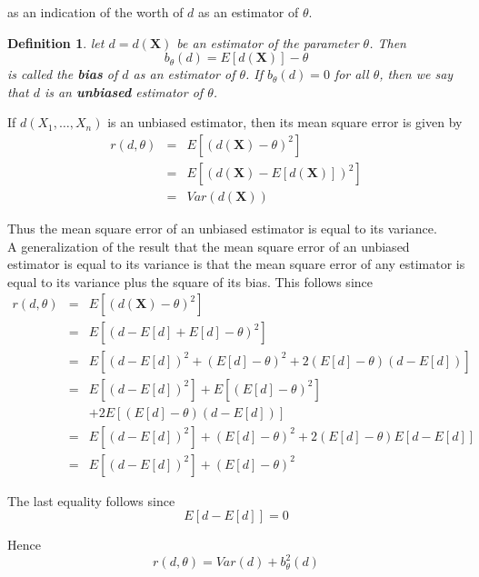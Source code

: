 \documentclass[12pt]{article}
\newtheorem{definition}[theorem]{Definition}
\begin{document}
as an indication of the worth of $d$ as an estimator of $\theta$.

\begin{definition}
  let $d = d(\textbf{X})$ be an estimator of the parameter $\theta$. Then
  \begin{equation*}
    b_{\theta}(d) = E[d(\textbf{X})] - \theta
  \end{equation*}
  is called the \textbf{bias} of $d$ as an estimator of $\theta$. If $b_{\theta}(d) = 0$ for all $\theta$, then we say that $d$ is an \textbf{unbiased} estimator of $\theta$.
\end{definition}

If $d(X_1, \dots, X_n)$ is an unbiased estimator, then its mean square error is given by
\begin{eqnarray*}
  r(d, \theta)
  &=& E[(d(\textbf{X}) - \theta)^2] \\
  &=& E[(d(\textbf{X}) - E[d(\textbf{X})])^2] \\
  &=& Var(d(\textbf{X}))
\end{eqnarray*}

Thus the mean square error of an unbiased estimator is equal to its variance. \\

A generalization of the result that the mean square error of an unbiased estimator is equal to its variance is that the mean square error of any estimator is equal to its variance plus the square of its bias. This follows since
\begin{eqnarray*}
  r(d, \theta)
  &=& E[(d(\textbf{X}) - \theta)^2] \\
  &=& E[(d - E[d] + E[d] - \theta)^2] \\
  &=& E[ (d - E[d])^2 + (E[d] - \theta)^2 + 2(E[d] - \theta)(d - E[d]) ] \\
  &=& E[(d - E[d])^2] + E[(E[d] - \theta)^2] \\
  &&  + 2E[(E[d] - \theta)(d - E[d])] \\
  &=& E[(d - E[d])^2] + (E[d] - \theta)^2 
  + 2(E[d] - \theta)E[d - E[d]] \\
  &=& E[(d - E[d])^2] + (E[d] - \theta)^2
\end{eqnarray*}

The last equality follows since
\begin{equation*}
  E[d - E[d]] = 0
\end{equation*}

Hence
\begin{equation*}
  r(d, \theta) = Var(d) + b_{\theta}^2 (d)
\end{equation*}
\end{document}
